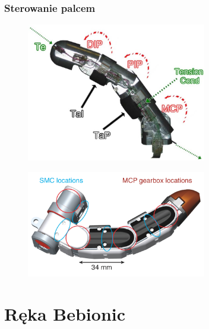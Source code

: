 \documentclass[8pt]{beamer}
\begin{document}
	\frametitle{Sterowanie palcem}
		\begin{frame}
			\begin{center}
				\begin{figure}
					\includegraphics[width=0.7\textwidth]{graphics/smarthand_finger.jpg}
					\label{graph:build}	
					\caption{ \cite{6361492}}
				\end{figure}
			\end{center}
		\end{frame}				

		\begin{frame}
			\begin{center}
				\begin{figure}
					\includegraphics[width=0.7\textwidth]{graphics/finger_motors_mpl.png}
					\label{graph:build}	
					\caption{ \cite{6361492}}
				\end{figure}
			\end{center}
		\end{frame}				


\section{Ręka Bebionic}
\end{document}
